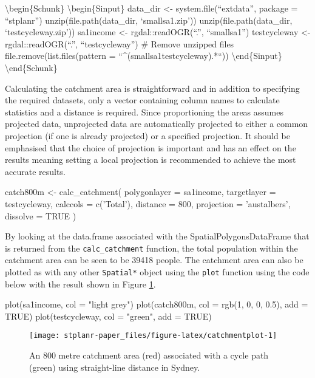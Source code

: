 \textbackslash{}begin\{Schunk\} \textbackslash{}begin\{Sinput\}
data\_dir \textless{}- system.file(``extdata'', package = ``stplanr'')
unzip(file.path(data\_dir, `smallsa1.zip')) unzip(file.path(data\_dir,
`testcycleway.zip')) sa1income \textless{}- rgdal::readOGR(``.'',
``smallsa1'') testcycleway \textless{}- rgdal::readOGR(``.'',
``testcycleway'') \# Remove unzipped files
file.remove(list.files(pattern =
``\^{}(smallsa1\textbar{}testcycleway).*``))
\textbackslash{}end\{Sinput\} \textbackslash{}end\{Schunk\}

Calculating the catchment area is straightforward and in addition to
specifying the required datasets, only a vector containing column names
to calculate statistics and a distance is required. Since proportioning
the areas assumes projected data, unprojected data are automatically
projected to either a common projection (if one is already projected) or
a specified projection. It should be emphasised that the choice of
projection is important and has an effect on the results meaning setting
a local projection is recommended to achieve the most accurate results.

\begin{Schunk}
\begin{Sinput}
catch800m <- calc_catchment(
  polygonlayer = sa1income,
  targetlayer = testcycleway,
  calccols = c('Total'),
  distance = 800,
  projection = 'austalbers',
  dissolve = TRUE
)
\end{Sinput}
\end{Schunk}

By looking at the data.frame associated with the
SpatialPolygonsDataFrame that is returned from the
\texttt{calc\_catchment} function, the total population within the
catchment area can be seen to be 39418 people. The catchment area can
also be plotted as with any other \texttt{Spatial*} object using the
\texttt{plot} function using the code below with the result shown in
Figure \ref{fig:catchmentplot}.

\begin{Schunk}
\begin{Sinput}
plot(sa1income, col = "light grey")
plot(catch800m, col = rgb(1, 0, 0, 0.5), add = TRUE)
plot(testcycleway, col = "green", add = TRUE)
\end{Sinput}
\begin{figure}
\texttt{[image: stplanr-paper\_files/figure-latex/catchmentplot-1]} \caption[An 800 metre catchment area (red) associated with a cycle path (green) using straight-line distance in Sydney]{An 800 metre catchment area (red) associated with a cycle path (green) using straight-line distance in Sydney.}\label{fig:catchmentplot}
\end{figure}
\end{Schunk}

